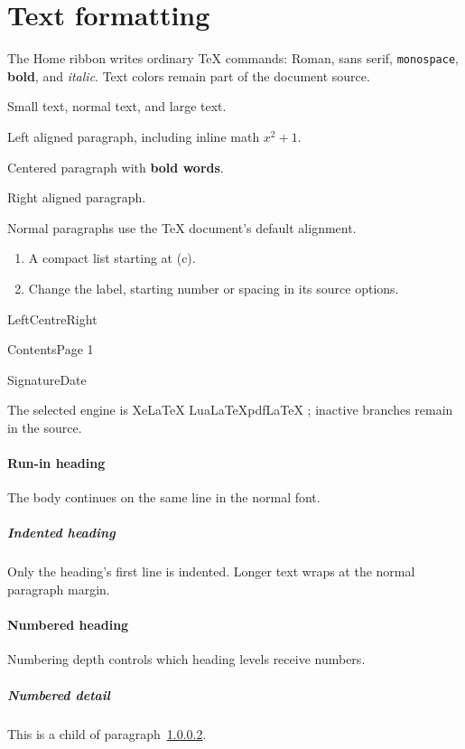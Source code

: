\documentclass{article}
\begin{document}
\section{Text formatting}
The Home ribbon writes ordinary TeX commands: \textrm{Roman},
\textsf{sans serif}, \texttt{monospace}, \textbf{bold}, and \textit{italic}.
\textcolor[HTML]{285E9C}{Text colors} remain part of the document source.

{\small Small text}, {\normalsize normal text}, and {\Large large text}.

\begin{flushleft}Left aligned paragraph, including inline math $x^2+1$.\end{flushleft}

\begin{center}Centered paragraph with \textbf{bold words}.\end{center}

\begin{flushright}Right aligned paragraph.\end{flushright}

Normal paragraphs use the TeX document's default alignment.

\begin{enumerate}[label=(\alph*),start=3,nosep,leftmargin=2em]
\item A compact list starting at (c).
\item Change the label, starting number or spacing in its source options.
\end{enumerate}

\noindent Left\hfill Centre\hfill Right

\noindent Contents\dotfill Page 1

\noindent Signature\hrulefill Date\hrulefill

The selected engine is
\ifXeTeX Xe\protect\LaTeX\else
  \ifLuaTeX Lua\protect\LaTeX\else pdf\protect\LaTeX\fi
\fi{}; inactive branches remain in the source.

\paragraph{Run-in heading}The body continues on the same line in the normal font.

\subparagraph{Indented heading}Only the heading's first line is indented.
Longer text wraps at the normal paragraph margin.

\setcounter{secnumdepth}{5}
\paragraph{Numbered heading}\label{par:numbered}Numbering depth controls which heading levels receive numbers.
\subparagraph{Numbered detail}This is a child of paragraph~\ref{par:numbered}.
\setcounter{secnumdepth}{3}
\end{document}
